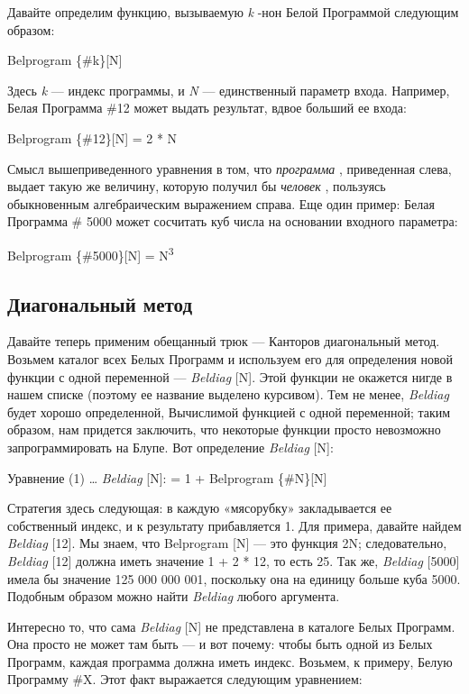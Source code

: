 \documentclass[../main.tex]{subfiles}
\begin{document}
Давайте определим функцию, вызываемую \emph{k} -нон Белой Программой следующим образом:

Belprogram \{\#k\}{[}N{]}

Здесь \emph{k} --- индекс программы, и \emph{N} --- единственный параметр входа. Например, Белая Программа \#12 может выдать результат, вдвое больший ее входа:

Belprogram \{\#12\}{[}N{]} = 2 * N

Смысл вышеприведенного уравнения в том, что \emph{программа} , приведенная слева, выдает такую же величину, которую получил бы \emph{человек} , пользуясь обыкновенным алгебраическим выражением справа. Еще один пример: Белая Программа \# 5000 может сосчитать куб числа на основании входного параметра:

Belprogram \{\#5000\}{[}N{]} = N\textsuperscript{3}


\subsection{Диагональный метод}

Давайте теперь применим обещанный трюк --- Канторов диагональный метод. Возьмем каталог всех Белых Программ и используем его для определения новой функции с одной переменной --- \emph{Beldiag} {[}N{]}. Этой функции не окажется нигде в нашем списке (поэтому ее название выделено курсивом). Тем не менее, \emph{Beldiag} будет хорошо определенной, Вычислимой функцией с одной переменной; таким образом, нам придется заключить, что некоторые функции просто невозможно запрограммировать на Блупе. Вот определение \emph{Beldiag} {[}N{]}:

Уравнение (1) \ldots{} \emph{Beldiag} {[}N{]}: = 1 + Belprogram \{\#N\}{[}N{]}

Стратегия здесь следующая: в каждую «мясорубку» закладывается ее собственный индекс, и к результату прибавляется 1. Для примера, давайте найдем \emph{Beldiag} {[}12{]}. Мы знаем, что Belprogram {[}N{]} --- это функция 2N; следовательно, \emph{Beldiag} {[}12{]} должна иметь значение 1 + 2 * 12, то есть 25. Так же, \emph{Beldiag} {[}5000{]} имела бы значение 125 000 000 001, поскольку она на единицу больше куба 5000. Подобным образом можно найти \emph{Beldiag} любого аргумента.

Интересно то, что сама \emph{Beldiag} {[}N{]} не представлена в каталоге Белых Программ. Она просто не может там быть --- и вот почему: чтобы быть одной из Белых Программ, каждая программа должна иметь индекс. Возьмем, к примеру, Белую Программу \#X. Этот факт выражается следующим уравнением:
\end{document}
